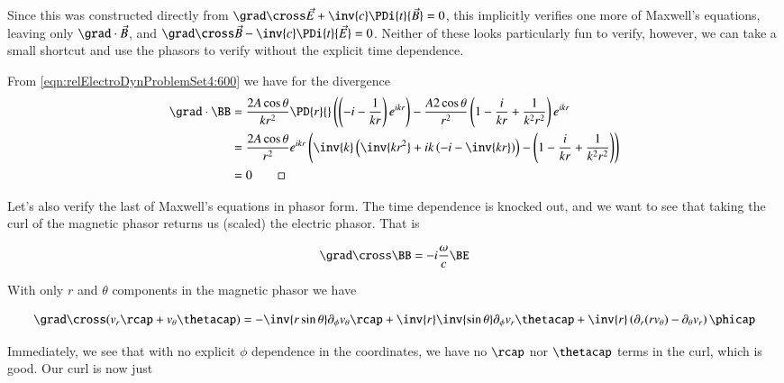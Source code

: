 Since this was constructed directly from $\grad \cross \vec{E} +\inv{c} \PDi{t}{\vec{B}} = 0$, this implicitly verifies one more of Maxwell's equations, leaving only $\grad \cdot \vec{B}$, and $\grad \cross \vec{B} -\inv{c} \PDi{t}{\vec{E}} = 0$.  Neither of these looks particularly fun to verify, however, we can take a small shortcut and use the phasors to verify without the explicit time dependence.

From \ref{eqn:relElectroDynProblemSet4:600} we have for the divergence
\begin{align*}
\grad \cdot \BB 
&=
\frac{2 A \cos\theta}{k r^2 } 
\PD{r}{} \left(
\left( -i - \frac{1}{k r} \right) e^{i k r} 
\right)
- \frac{A 2 \cos\theta}{r^2} \left( 1 - \frac{i}{k r} + \frac{1}{k^2 r^2} \right) e^{i k r}  \\
&=
\frac{2 A \cos\theta}{r^2 } e^{i k r}
\left(
\inv{k}\left( \inv{k r^2} + i k \left(-i - \inv{k r}\right)
\right)
-
\left( 1 - \frac{i}{k r} + \frac{1}{k^2 r^2} \right) 
\right) \\
&= 0 \qquad \square
\end{align*}

Let's also verify the last of Maxwell's equations in phasor form.  The time dependence is knocked out, and we want to see that taking the curl of the magnetic phasor returns us (scaled) the electric phasor.  That is

\begin{equation}\label{eqn:relElectroDynProblemSet4:620}
\grad \cross \BB = - i \frac{\omega}{c} \BE
\end{equation}

With only $r$ and $\theta$ components in the magnetic phasor we have

\begin{equation}\label{eqn:relElectroDynProblemSet4:630}
\grad \cross (v_r \rcap + v_\theta \thetacap) 
=
-\inv{r \sin\theta} 
\partial_\phi v_\theta
\rcap
+
\inv{r } 
\inv{\sin\theta} \partial_\phi v_r 
\thetacap
+
\inv{r } \left(
\partial_r (r v_\theta) - \partial_\theta v_r
\right) \phicap
\end{equation}

Immediately, we see that with no explicit $\phi$ dependence in the coordinates, we have no $\rcap$ nor $\thetacap$ terms in the curl, which is good.  Our curl is now just

